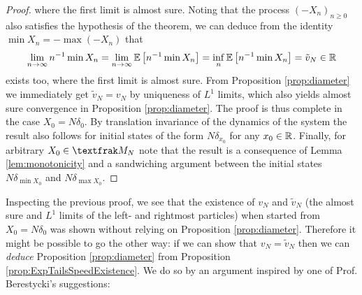 \begin{proof}
where the first limit is almost sure. Noting that the process $(-X_n)_{n \geq 0}$ also satisfies the hypothesis of the theorem, we can deduce from the identity $\min X_n = - \max (-X_n)$ that 
\begin{equation}\nonumber
\lim_{n \to \infty} n^{-1} \min X_n = \lim_{n \to \infty} \mathbb{E}\left[ n^{-1} \min X_n \right] = \inf_n \mathbb{E}\left[ n^{-1} \min X_n \right] = \tilde{v}_N \in \mathbb{R}
\end{equation}
exists too, where the first limit is almost sure. From Proposition \ref{prop:diameter} we immediately get $\tilde{v}_N = v_N$ by uniqueness of $L^1$ limits, which also yields almost sure convergence in Proposition \ref{prop:diameter}. The proof is thus complete in the case $X_0 = N \delta_0$. By translation invariance of the dynamics of the system the result also follows for initial states of the form $N \delta_{x_0}$ for any $x_0 \in \mathbb{R}$. Finally, for arbitrary $X_0 \in \frak{M}_N$ note that the result is a consequence of Lemma \ref{lem:monotonicity} and a sandwiching argument between the initial states $N \delta_{\min X_0}$ and $N \delta_{\max X_0}$. 
\end{proof}


Inspecting the previous proof, we see that the existence of $v_N$ and $\tilde{v}_N$ (the almost sure and $L^1$ limits of the left- and rightmost particles) when started from $X_0 = N \delta_0$ was shown without relying on Proposition \ref{prop:diameter}. Therefore it might be possible to go the other way: if we can show that $v_N = \tilde{v}_N$ then we can \textit{deduce} Proposition \ref{prop:diameter} from Proposition \ref{prop:ExpTailsSpeedExistence}. We do so by an argument inspired by one of Prof. Berestycki's suggestions:

